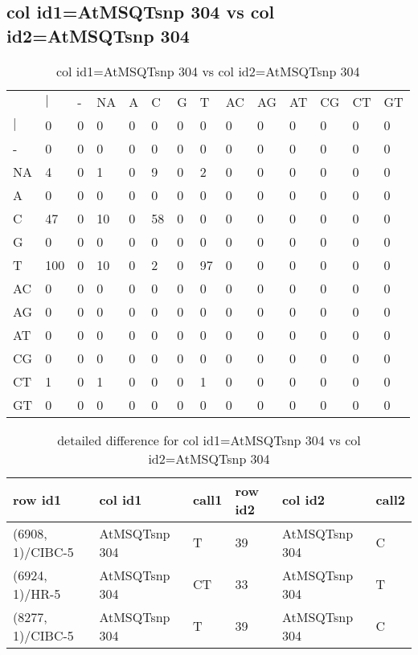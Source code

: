 \subsection{col id1=AtMSQTsnp 304 vs col id2=AtMSQTsnp 304}
\begin{center}
\begin{longtable}{|l|l|l|l|l|l|l|l|l|l|l|l|l|l|}
\caption{col id1=AtMSQTsnp 304 vs col id2=AtMSQTsnp 304} \label{table_dm842}\\
\hline
\\
\hline
&$|$&-&NA&A&C&G&T&AC&AG&AT&CG&CT&GT\\
$|$&0&0&0&0&0&0&0&0&0&0&0&0&0\\
-&0&0&0&0&0&0&0&0&0&0&0&0&0\\
NA&4&0&1&0&9&0&2&0&0&0&0&0&0\\
A&0&0&0&0&0&0&0&0&0&0&0&0&0\\
C&47&0&10&0&58&0&0&0&0&0&0&0&0\\
G&0&0&0&0&0&0&0&0&0&0&0&0&0\\
T&100&0&10&0&2&0&97&0&0&0&0&0&0\\
AC&0&0&0&0&0&0&0&0&0&0&0&0&0\\
AG&0&0&0&0&0&0&0&0&0&0&0&0&0\\
AT&0&0&0&0&0&0&0&0&0&0&0&0&0\\
CG&0&0&0&0&0&0&0&0&0&0&0&0&0\\
CT&1&0&1&0&0&0&1&0&0&0&0&0&0\\
GT&0&0&0&0&0&0&0&0&0&0&0&0&0\\
\hline
\end{longtable}
\end{center}

\begin{center}
\begin{longtable}{|l|l|l|l|l|l|}
\caption{detailed difference for col id1=AtMSQTsnp 304 vs col id2=AtMSQTsnp 304} \label{table_dm843}\\
\hline
row id1&col id1&call1&row id2&col id2&call2\\
\hline
(6908, 1)/CIBC-5&AtMSQTsnp 304&T&39&AtMSQTsnp 304&C\\
(6924, 1)/HR-5&AtMSQTsnp 304&CT&33&AtMSQTsnp 304&T\\
(8277, 1)/CIBC-5&AtMSQTsnp 304&T&39&AtMSQTsnp 304&C\\
\hline
\end{longtable}
\end{center}

